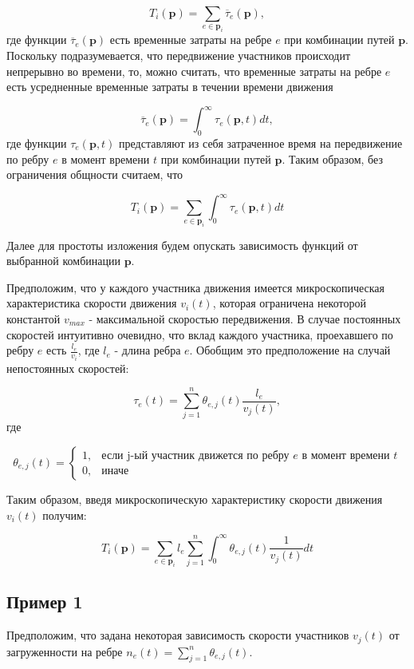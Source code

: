 \documentclass[12pt, a4paper]{article}
\begin{document}
$$T_i (\textbf{p}) = \sum \limits_{e \in \textbf{p}_i} \overline{\tau}_e (\textbf{p}), $$
где функции $\overline{\tau}_e (\textbf{p})$ есть временные затраты на ребре $e$ при комбинации путей $\textbf{p}$. Поскольку подразумевается, что передвижение участников происходит непрерывно во времени, то, можно считать, что временные затраты на ребре $e$ есть усредненные временные затраты в течении времени движения

$$ \overline{\tau}_e (\textbf{p}) = \int_{0}^{\infty} \tau_e (\textbf{p}, t) dt,$$
где функции  $\tau_e (\textbf{p}, t)$ представляют из себя затраченное время на передвижение по ребру $e$ в момент времени $t$ при комбинации путей $\textbf{p}$. Таким образом, без ограничения общности считаем, что

$$T_i (\textbf{p}) = \sum \limits_{e \in \textbf{p}_i} \int_{0}^{\infty} \tau_e (\textbf{p}, t) dt $$

Далее для простоты изложения будем опускать зависимость функций от выбранной комбинации $\textbf{p}$.

Предположим, что у каждого участника движения имеется микроскопическая характеристика скорости движения $v_i(t)$, которая ограничена некоторой константой $v_{max}$ - максимальной скоростью передвижения. В случае постоянных скоростей интуитивно очевидно, что вклад каждого участника, проехавшего по ребру $e$ есть $\frac{l_e}{v_i}$, где $l_e$ - длина ребра $e$. Обобщим это предположение на случай непостоянных скоростей:

$$  \tau_e (t) = \sum \limits_{j = 1}^n \theta_{e, j} (t) \frac{l_e}{v_j(t)}, $$
где 

$$
\theta_{e, j} (t) =
\begin{cases}
	1, & \text{если}  \text{ j-ый участник движется по ребру $e$ в момент времени $t$}  \\
	0, & \text{иначе}
\end{cases}
$$

Таким образом, введя микроскопическую характеристику скорости движения $v_i(t)$ получим:

$$T_i (\textbf{p}) = \sum \limits_{e \in \textbf{p}_i} l_e \sum \limits_{j = 1}^n \int_{0}^{\infty} \theta_{e, j} (t) \frac{1}{v_j(t)} dt $$


\subsection*{Пример 1}

Предположим, что задана некоторая зависимость скорости участников $v_j(t)$ от загруженности на ребре $n_e(t) = \sum\limits_{j = 1}^n\theta_{e, j} (t)$.
\end{document}
